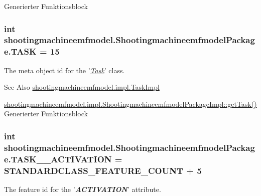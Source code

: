 Generierter Funktionsblock  \hypertarget{interfaceshootingmachineemfmodel_1_1_shootingmachineemfmodel_package_a11c1e4cd4815521f642d021ef075f350}{
\subsubsection[{T\-A\-S\-K}]{\setlength{\rightskip}{0pt plus 5cm}int shootingmachineemfmodel.\-Shootingmachineemfmodel\-Package.\-T\-A\-S\-K = 15}}\label{interfaceshootingmachineemfmodel_1_1_shootingmachineemfmodel_package_a11c1e4cd4815521f642d021ef075f350}
The meta object id for the '\hyperlink{classshootingmachineemfmodel_1_1impl_1_1_task_impl}{{\itshape Task}}' class.

\begin{DoxySeeAlso}{See Also}
\hyperlink{classshootingmachineemfmodel_1_1impl_1_1_task_impl}{shootingmachineemfmodel.\-impl.\-Task\-Impl} 

\hyperlink{classshootingmachineemfmodel_1_1impl_1_1_shootingmachineemfmodel_package_impl_a4cb0a1f2bdfdc0313e25e54cb0e15c45}{shootingmachineemfmodel.\-impl.\-Shootingmachineemfmodel\-Package\-Impl\-::get\-Task()} Generierter Funktionsblock 
\end{DoxySeeAlso}
\hypertarget{interfaceshootingmachineemfmodel_1_1_shootingmachineemfmodel_package_acaa0d423bb2cc890173d67409494bd3d}{
\subsubsection[{T\-A\-S\-K\-\_\-\-\_\-\-A\-C\-T\-I\-V\-A\-T\-I\-O\-N}]{\setlength{\rightskip}{0pt plus 5cm}int shootingmachineemfmodel.\-Shootingmachineemfmodel\-Package.\-T\-A\-S\-K\-\_\-\-\_\-\-A\-C\-T\-I\-V\-A\-T\-I\-O\-N = {\bf S\-T\-A\-N\-D\-A\-R\-D\-C\-L\-A\-S\-S\-\_\-\-F\-E\-A\-T\-U\-R\-E\-\_\-\-C\-O\-U\-N\-T} + 5}}\label{interfaceshootingmachineemfmodel_1_1_shootingmachineemfmodel_package_acaa0d423bb2cc890173d67409494bd3d}
The feature id for the '{\itshape {\bfseries A\-C\-T\-I\-V\-A\-T\-I\-O\-N}}' attribute.

